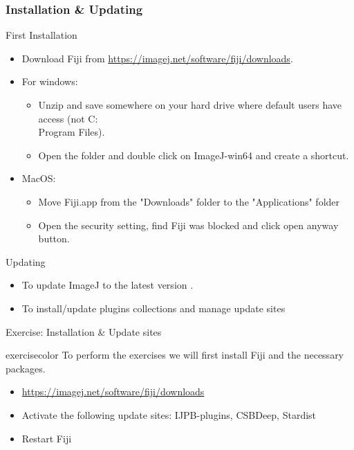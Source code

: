 \documentclass[ignorenonframetext,aspectratio=169,10pt,xcolor=table]{beamer}
\begin{document}
\begin{frame} \frametitle{Installation \& Updating}

  \begin{block}{First Installation}
    \begin{itemize}
      \item Download Fiji from  \url{https://imagej.net/software/fiji/downloads}.
      \item For windows:
            \begin{itemize}
              \item Unzip and save somewhere on your hard drive where default
                    users have access (not C:\\Program Files).
              \item Open the folder and double click on ImageJ-win64
                    and create a shortcut.
            \end{itemize}
      \item MacOS:
            \begin{itemize}
              \item Move Fiji.app from the "Downloads" folder to the "Applications" folder
              \item Open the security setting, find Fiji was blocked and click open anyway button.
            \end{itemize}
    \end{itemize}
  \end{block}

  \begin{block}{Updating}
    \begin{itemize}
      \item To update ImageJ to the latest version .
      \item To install/update plugins collections and manage update
            sites 
    \end{itemize}
  \end{block}
\end{frame}

\begin{frame}{Exercise: Installation \& Update sites}
  \noindent\begin{beamercolorbox}[rounded=true, shadow=true,sep=-1em]{exercisecolor}%
    To perform the exercises we will first install Fiji and the necessary packages.
    \begin{itemize}
      \item \url{https://imagej.net/software/fiji/downloads}
      \item Activate the following update sites: IJPB-plugins, CSBDeep, Stardist
      \item Restart Fiji
    \end{itemize}
  \end{beamercolorbox}
\end{frame}
\end{document}
